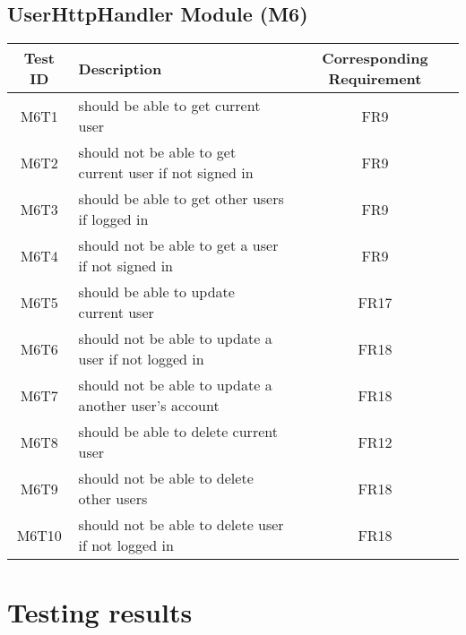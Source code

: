 \documentclass[fullpage]{article}
\begin{document}
\subsection{UserHttpHandler Module (M6)}
\begin{table}[H]
\flushleft
\begin{tabular}{|c|p{8.5cm}|c|}
\hline
 \rowcolor{lightgray}
\textbf{Test ID} &\textbf{Description} &\textbf{Corresponding Requirement}\\
\hline
M6T1 & should be able to get current user & FR9 \\
\hline
M6T2 & should not be able to get current user if not signed in & FR9 \\
\hline
M6T3 & should be able to get other users if logged in & FR9 \\
\hline
M6T4 & should not be able to get a user if not signed in & FR9 \\
\hline
M6T5 & should be able to update current user & FR17 \\
\hline
M6T6 & should not be able to update a user if not logged in & FR18 \\
\hline
M6T7 & should not be able to update a another user's account & FR18 \\
\hline
M6T8 & should be able to delete current user & FR12 \\
\hline
M6T9 & should not be able to delete other users & FR18 \\
\hline
M6T10 & should not be able to delete user if not logged in & FR18 \\
\hline
\end{tabular}
\end{table}


\section{Testing results}
\end{document}
